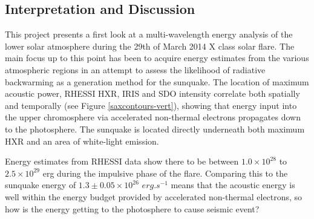 \subsection{Interpretation and Discussion}
This project presents a first look at a multi-wavelength energy analysis of the lower solar atmosphere during the 29th of March 2014 X class solar flare. The main focus up to this point has been to acquire energy estimates from the various atmospheric regions in an attempt to assess the likelihood of radiative backwarming as a generation method for the sunquake. The location of maximum acoustic power, RHESSI HXR, IRIS and SDO intensity correlate both spatially and temporally (see Figure \ref{saxcontours-vert}), showing that energy input into the upper chromosphere via accelerated non-thermal electrons propagates down to the photosphere. The sunquake is located directly underneath both maximum HXR and an area of white-light emission.

Energy estimates from RHESSI data show there to be between $1.0{\times}10^{28}$ to $2.5{\times}10^{29}$ erg during the impulsive phase of the flare. Comparing this to the sunquake energy of $1.3\pm0.05{\times}10^{26}$ $erg.s^{-1}$ means that the acoustic energy is well within the energy budget provided by accelerated non-thermal electrons, so how is the energy getting to the photosphere to cause seismic event?

